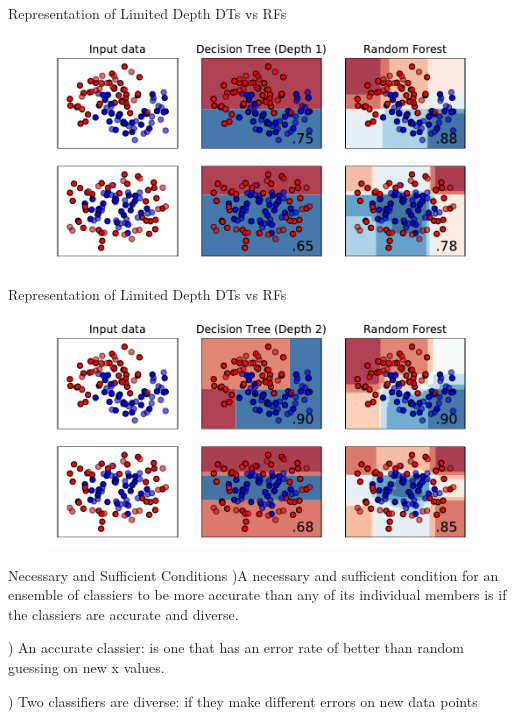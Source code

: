 \documentclass{beamer}
\begin{document}
\begin{frame}{Representation of Limited Depth DTs vs RFs}
\begin{figure}
	\includegraphics[scale=0.7]{1-representation.pdf}
\end{figure}
\end{frame}

\begin{frame}{Representation of Limited Depth DTs vs RFs}
\begin{figure}
	\includegraphics[scale=0.7]{2-representation.pdf}
\end{figure}
\end{frame}




	\begin{frame}{Necessary and Sufficient Conditions}
	)A necessary and sufficient condition for an ensemble of classiers to be more
	accurate than any of its individual members is if the classiers are accurate and
	diverse.
	
	) An accurate classier: \pause  is one that has an
	error rate of better than random guessing on new x values.
	
	) Two classifiers are diverse: \pause  if they make different errors on new data points 
	
\end{frame}
\end{document}
